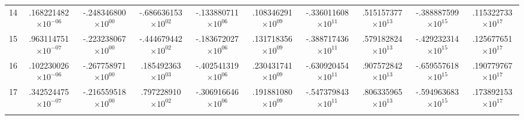 \documentclass[reviewcopy]{elsarticle}
\begin{document}
\begin{landscape}
\begin{longtable}{lccccccccc}
		14  & .168221482$\times10^{-06}$  &  -.248346800$\times10^{00}$ & -.686636153$\times10^{02}$ &  -.133880711$\times10^{06}$ &  .108346291$\times10^{09}$ &  -.336011608$\times10^{11}$ &  .515157377$\times10^{13}$ & -.388887599$\times10^{15}$  &  .115322733$\times10^{17}$  \\
		15  & .963114751$\times10^{-07}$  &  -.223238067$\times10^{00}$ & -.444679442$\times10^{02}$ &  -.183672027$\times10^{06}$ &  .131718356$\times10^{09}$ &  -.388717436$\times10^{11}$ &  .579182824$\times10^{13}$ & -.429232314$\times10^{15}$  &  .125677651$\times10^{17}$  \\
		16  & .102230026$\times10^{-06}$  &  -.267758971$\times10^{00}$ &  .185492363$\times10^{03}$ &  -.402541319$\times10^{06}$ &  .230431741$\times10^{09}$ &  -.630920454$\times10^{11}$ &  .907572842$\times10^{13}$ & -.659557618$\times10^{15}$  &  .190779767$\times10^{17}$  \\
		17  & .342524475$\times10^{-07}$  &  -.216559518$\times10^{00}$ &  .797228910$\times10^{02}$ &  -.306916646$\times10^{06}$ &  .191881080$\times10^{09}$ &  -.547379843$\times10^{11}$ &  .806335965$\times10^{13}$ & -.594963683$\times10^{15}$  &  .173892153$\times10^{17}$ \\[3pt]
\hline \\
\end{longtable}
\normalsize
\renewcommand{\thefootnote}{\arabic{footnote}}
\renewcommand{\arraystretch}{1.0}
\end{landscape}

\newpage
\end{document}
